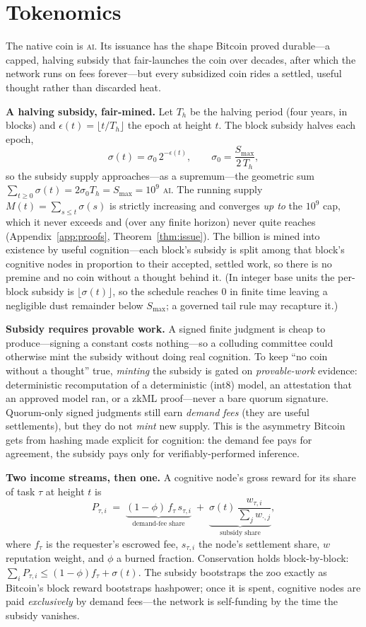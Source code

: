 \documentclass[11pt]{article}
\begin{document}
\section{Tokenomics}

The native coin is \textsc{ai}. Its issuance has the shape Bitcoin proved durable---a capped, halving subsidy that fair-launches the coin over decades, after which the network runs on fees forever---but every subsidized coin rides a settled, useful thought rather than discarded heat.

\medskip\noindent\textbf{A halving subsidy, fair-mined.} Let $T_h$ be the halving period (four years, in blocks) and $\epsilon(t)=\lfloor t/T_h\rfloor$ the epoch at height $t$. The block subsidy halves each epoch,
\[ \sigma(t)=\sigma_0\,2^{-\epsilon(t)},\qquad \sigma_0=\frac{S_{\max}}{2\,T_h}, \]
so the subsidy supply approaches---as a supremum---the geometric sum $\sum_{t\ge0}\sigma(t)=2\sigma_0 T_h=S_{\max}=10^9$ \textsc{ai}. The running supply $M(t)=\sum_{s\le t}\sigma(s)$ is strictly increasing and converges \emph{up to} the $10^9$ cap, which it never exceeds and (over any finite horizon) never quite reaches (Appendix~\ref{app:proofs}, Theorem~\ref{thm:issue}). The billion is mined into existence by useful cognition---each block's subsidy is split among that block's cognitive nodes in proportion to their accepted, settled work, so there is no premine and no coin without a thought behind it. (In integer base units the per-block subsidy is $\lfloor\sigma(t)\rfloor$, so the schedule reaches $0$ in finite time leaving a negligible dust remainder below $S_{\max}$; a governed tail rule may recapture it.)

\medskip\noindent\textbf{Subsidy requires provable work.} A signed finite judgment is cheap to produce---signing a constant costs nothing---so a colluding committee could otherwise mint the subsidy without doing real cognition. To keep ``no coin without a thought'' true, \emph{minting} the subsidy is gated on \emph{provable-work} evidence: deterministic recomputation of a deterministic (int8) model, an attestation that an approved model ran, or a zkML proof---never a bare quorum signature. Quorum-only signed judgments still earn \emph{demand fees} (they are useful settlements), but they do not \emph{mint} new supply. This is the asymmetry Bitcoin gets from hashing made explicit for cognition: the demand fee pays for agreement, the subsidy pays only for verifiably-performed inference.

\medskip\noindent\textbf{Two income streams, then one.} A cognitive node's gross reward for its share of task $\tau$ at height $t$ is
\[ P_{\tau,i} \;=\; \underbrace{(1-\phi)\,f_\tau\,s_{\tau,i}}_{\text{demand-fee share}} \;+\; \underbrace{\sigma(t)\,\frac{w_{\tau,i}}{\textstyle\sum_j w_{\cdot,j}}}_{\text{subsidy share}}, \]
where $f_\tau$ is the requester's escrowed fee, $s_{\tau,i}$ the node's settlement share, $w$ reputation weight, and $\phi$ a burned fraction. Conservation holds block-by-block: $\sum_i P_{\tau,i}\le (1-\phi)f_\tau+\sigma(t)$. The subsidy bootstraps the zoo exactly as Bitcoin's block reward bootstraps hashpower; once it is spent, cognitive nodes are paid \emph{exclusively} by demand fees---the network is self-funding by the time the subsidy vanishes.
\end{document}
